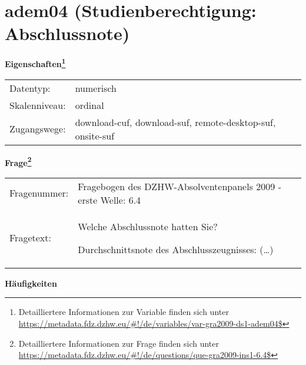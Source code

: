 
    \setcounter{footnote}{0}

    \vspace*{-1.8cm}
	\section{adem04 (Studienberechtigung: Abschlussnote)}
	\label{section:adem04}



    \vspace*{0.5cm}
    \noindent\textbf{Eigenschaften\footnote{Detailliertere Informationen zur Variable finden sich unter
		\url{https://metadata.fdz.dzhw.eu/\#!/de/variables/var-gra2009-ds1-adem04$}}}\\
	\begin{tabularx}{\hsize}{@{}lX}
	Datentyp: & numerisch \\
	Skalenniveau: & ordinal \\
	Zugangswege: &
	  download-cuf, 
	  download-suf, 
	  remote-desktop-suf, 
	  onsite-suf
 \\
    \end{tabularx}



				\vspace*{0.5cm}
                \noindent\textbf{Frage\footnote{Detailliertere Informationen zur Frage finden sich unter
		              \url{https://metadata.fdz.dzhw.eu/\#!/de/questions/que-gra2009-ins1-6.4$}}}\\
				\begin{tabularx}{\hsize}{@{}lX}
					Fragenummer: &
					  Fragebogen des DZHW-Absolventenpanels 2009 - erste Welle:
					  6.4
 \\
					Fragetext: & Welche Abschlussnote hatten Sie?\par  Durchschnittsnote des Abschlusszeugnisses: (…) \\
				\end{tabularx}





        		\vspace*{0.5cm}
                \noindent\textbf{Häufigkeiten}


